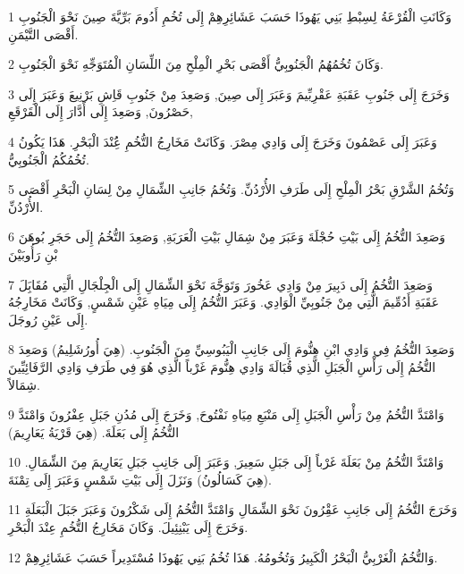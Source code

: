 \par 1 وَكَانَتِ الْقُرْعَةُ لِسِبْطِ بَنِي يَهُوذَا حَسَبَ عَشَائِرِهِمْ إِلَى تُخُمِ أَدُومَ بَرِّيَّةَ صِينَ نَحْوَ الْجَنُوبِ أَقْصَى التَّيْمَنِ.
\par 2 وَكَانَ تُخُمُهُمُ الْجَنُوبِيُّ أَقْصَى بَحْرِ الْمِلْحِ مِنَ اللِّسَانِ الْمُتَوَجِّهِ نَحْوَ الْجَنُوبِ.
\par 3 وَخَرَجَ إِلَى جَنُوبِ عَقَبَةِ عَقْرِبِّيمَ وَعَبَرَ إِلَى صِينَ, وَصَعِدَ مِنْ جَنُوبِ قَاِشِ بَرْنِيعَ وَعَبَرَ إِلَى حَصْرُونَ, وَصَعِدَ إِلَى أَدَّارَ إِلَى الْقَرْقَعِ,
\par 4 وَعَبَرَ إِلَى عَصْمُونَ وَخَرَجَ إِلَى وَادِي مِصْرَ. وَكَانَتْ مَخَارِجُ التُّخُمِ عَُِنْدَ الْبَحْرِ. هَذَا يَكُونُ تُخُمُكُمُ الْجَنُوبِيُّ.
\par 5 وَتُخُمُ الشَّرْقِ بَحْرُ الْمِلْحِ إِلَى طَرَفِ الأُرْدُنِّ. وَتُخُمُ جَانِبِ الشِّمَالِ مِنْ لِسَانِ الْبَحْرِ أَقْصَى الأُرْدُنِّ.
\par 6 وَصَعِدَ التُّخُمُ إِلَى بَيْتِ حُجْلَةَ وَعَبَرَ مِنْ شِمَالِ بَيْتِ الْعَرَبَةِ, وَصَعِدَ التُّخُمُ إِلَى حَجَرِ بُوهَنَ بْنِ رَأُوبَيْنَ
\par 7 وَصَعِدَ التُّخُمُ إِلَى دَبِيرَ مِنْ وَادِي عَخُورَ وَتَوَجَّهَ نَحْوَ الشِّمَالِ إِلَى الْجِلْجَالِ الَّتِي مُقَابَِلَ عَقَبَةِ أَدُمِّيمَ الَّتِي مِنْ جَنُوبِيِّ الْوَادِي. وَعَبَرَ التُّخُمُ إِلَى مِيَاهِ عَيْنِ شَمْسٍ, وَكَانَتْ مَخَارِجُهُ إِلَى عَيْنِ رُوجَلَ.
\par 8 وَصَعِدَ التُّخُمُ فِي وَادِي ابْنِ هِنُّومَ إِلَى جَانِبِ الْيَبُوسِيِّ مِنَ الْجَنُوبِ. (هِيَ أُورُشَلِيمُ) وَصَعِدَ التُّخُمُ إِلَى رَأْسِ الْجَبَلِ الَّذِي قُبَالَةَ وَادِي هِنُّومَ غَرْباً الَّذِي هُوَ فِي طَرَفِ وَادِي الرَّفَائِيِّينَ شِمَالاً.
\par 9 وَامْتَدَّ التُّخُمُ مِنْ رَأْسِ الْجَبَلِ إِلَى مَنْبَعِ مِيَاهِ نَفْتُوحَ, وَخَرَجَ إِلَى مُدُنِ جَبَلِ عِفْرُونَ وَامْتَدَّ التُّخُمُ إِلَى بَعَلَةَ. (هِيَ قَرْيَةُ يَعَارِيمَ)
\par 10 وَامْتَدَّ التُّخُمُ مِنْ بَعَلَةَ غَرْباً إِلَى جَبَلِ سَعِيرَ, وَعَبَرَ إِلَى جَانِبِ جَبَلِ يَعَارِيمَ مِنَ الشِّمَالِ. (هِيَ كَسَالُونُ) وَنَزَلَ إِلَى بَيْتِ شَمْسٍ وَعَبَرَ إِلَى تِمْنَةَ.
\par 11 وَخَرَجَ التُّخُمُ إِلَى جَانِبِ عَقِْرُونَ نَحْوَ الشِّمَالِ وَامْتَدَّ التُّخُمُ إِلَى شَكْرُونَ وَعَبَرَ جَبَلَ الْبَعَلَةِ وَخَرَجَ إِلَى يَبْنِئِيلَ. وَكَانَ مَخَارِجُ التُّخُمِ عِنْدَ الْبَحْرِ.
\par 12 وَالتُّخُمُ الْغَرْبِيُّ الْبَحْرُ الْكَبِيرُ وَتُخُومُهُ. هَذَا تُخُمُ بَنِي يَهُوذَا مُسْتَدِيراً حَسَبَ عَشَائِرِهِمْ.
